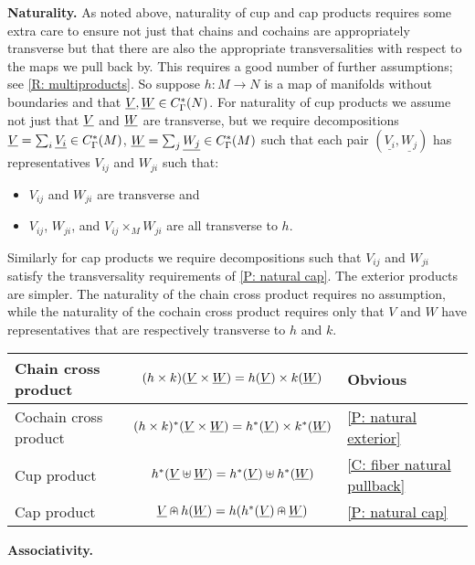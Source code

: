 \textbf{Naturality.}
As noted above, naturality of cup and cap products requires some extra care to ensure not just that chains and cochains are appropriately transverse but that there are also the appropriate transversalities with respect to the maps we pull back by.
This requires a good number of further assumptions; see \cref{R: multiproducts}.
So suppose $h \colon M \to N$ is a map of manifolds without boundaries and that $\underline{V},\underline{W} \in C^*_{\Gamma}(N)$.
For naturality of cup products we assume not just that $\underline{V}$ and $\underline{W}$ are transverse, but we require decompositions $\underline{V} = \sum_i \underline{V_i} \in C_\Gamma^*(M)$, $\underline{W} = \sum_j \underline{W_j} \in C_\Gamma^*(M)$ such that each pair $(\underline{V_i},\underline{W_j})$ has representatives $V_{ij}$ and $W_{ji}$ such that:
\begin{itemize}
	\item $V_{ij}$ and $W_{ji}$ are transverse and
	\item $V_{ij}$, $W_{ji}$, and $V_{ij} \times_M W_{ji}$ are all transverse to $h$.
\end{itemize}

Similarly for cap products we require decompositions such that $V_{ij}$ and $W_{ji}$ satisfy the transversality requirements of \cref{P: natural cap}.
The exterior products are simpler.
The naturality of the chain cross product requires no assumption, while the naturality of the cochain cross product requires only that $V$ and $W$ have representatives that are respectively transverse to $h$ and $k$.

\begin{center}
	\begin{tabular}{|l|c|l|}
		\hline
		Chain cross product&$(h \times k)(\underline{V} \times \underline{W}) = h(\underline{V}) \times k(\underline{W})$ &Obvious\\
		\hline
		Cochain cross product&$(h \times k)^*(\underline{V} \times \underline{W}) = h^*(\underline{V}) \times k^*(\underline{W})$ &\cref{P: natural exterior}\\
		\hline
		Cup product &$h^*(\underline{V}\uplus \underline{W}) = h^*(\underline{V}) \uplus h^*(\underline{W})$&\cref{C: fiber natural pullback}\\
		\hline
		Cap product &$\underline{V} \nplus h(\underline{W}) = h(h^*(\underline{V})\nplus \underline{W})$&\cref{P: natural cap}\\
		\hline
	\end{tabular}
\end{center}

\medskip\noindent\textbf{Associativity.}

